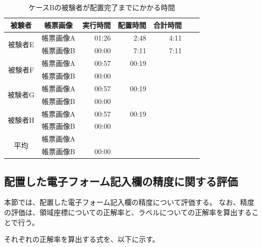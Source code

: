 \begin{table}[t]
	\caption{ケースBの被験者が配置完了までにかかる時間}
	\label{tb:result_accuracy}
	\centering
	\begin{tabular}{cc||rrrr|r}
		被験者 & 帳票画像 & 実行時間 & 配置時間 & 合計時間 \\
        \hline \hline

		\multirow{2}{*}{被験者E} &  帳票画像A & 01:26 & 2:48 & 4:11 \\
                                &   帳票画像B & 00:00 & 7:11 & 7:11 \\
                                \hline

		\multirow{2}{*}{被験者F} &  帳票画像A & 00:57 & 00:19 &  \\
                                &   帳票画像B & 00:00 &  &  \\
                                \hline

		\multirow{2}{*}{被験者G} &  帳票画像A & 00:57 & 00:19 &  \\
                                &   帳票画像B & 00:00 &  &  \\
                                \hline

		\multirow{2}{*}{被験者H} &  帳票画像A & 00:57 & 00:19 &  \\
                                &   帳票画像B & 00:00 &  &  \\
                                \hline \hline

		\multirow{2}{*}{平均}   &  帳票画像A &  &  &  \\
                               &   帳票画像B & 00:00 &  &  \\
	\end{tabular}
\end{table}

\subsection{配置した電子フォーム記入欄の精度に関する評価}\label{subsec:evalue_accuracy}
本節では、配置した電子フォーム記入欄の精度について評価する。
なお、精度の評価は、領域座標についての正解率と、ラベルについての正解率を算出することで行う。

それぞれの正解率を算出する式を、以下に示す。


